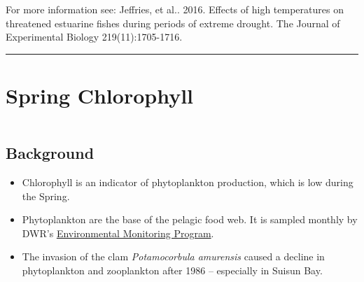 \documentclass[
]{book}
\providecommand{\tightlist}{%
  \setlength{\itemsep}{0pt}\setlength{\parskip}{0pt}}
\begin{document}
\begin{disclaimer}
For more information see: Jeffries, et al.. 2016. Effects of high
temperatures on threatened estuarine fishes during periods of extreme
drought. The Journal of Experimental Biology 219(11):1705-1716.
\end{disclaimer}

\begin{center}\rule{0.5\linewidth}{0.5pt}\end{center}

\hypertarget{spring-chlorophyll}{%
\section{Spring Chlorophyll}\label{spring-chlorophyll}}

\begin{columns-nocenter}

\begin{column}

\hypertarget{background-2}{%
\subsection{Background}\label{background-2}}

\begin{itemize}
\tightlist
\item
  Chlorophyll is an indicator of phytoplankton production, which is low during the Spring.
\item
  Phytoplankton are the base of the pelagic food web. It is sampled monthly by DWR's \href{https://emp.baydeltalive.com/wiki/12297}{Environmental Monitoring Program}.
\item
  The invasion of the clam \emph{Potamocorbula amurensis} caused a decline in phytoplankton and zooplankton after 1986 -- especially in Suisun Bay.
\end{itemize}

\end{column}

\begin{column}

\begin{figure}


\end{figure}
\end{column}
\end{columns-nocenter}
\end{document}
